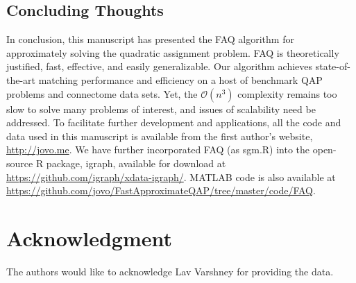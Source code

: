 \documentclass[10pt]{article}
\providecommand{\mc}[1]{\mathcal{#1}}
\providecommand{\mc}[1]{\mathcal{#1}}
\begin{document}
\subsection{Concluding Thoughts}

In conclusion, this manuscript has presented the FAQ algorithm for approximately solving the quadratic assignment problem.  FAQ is theoretically justified, fast, effective, and easily generalizable.  Our algorithm achieves state-of-the-art matching performance and efficiency on a host of benchmark QAP problems and connectome data sets.  Yet, the $\mc{O}(n^3)$ complexity remains too slow to solve many problems of interest, and issues of scalability need be addressed.  To facilitate further development and applications, all the code and data used in this manuscript is available from the first author's website, \url{http://jovo.me}.  We have further incorporated FAQ (as sgm.R) into the open-source R package, igraph, available for download at \url{https://github.com/igraph/xdata-igraph/}.  MATLAB code is also available at \url{https://github.com/jovo/FastApproximateQAP/tree/master/code/FAQ}.

\section*{Acknowledgment}

The authors would like to acknowledge 
Lav Varshney for providing the data. 
\end{document}
